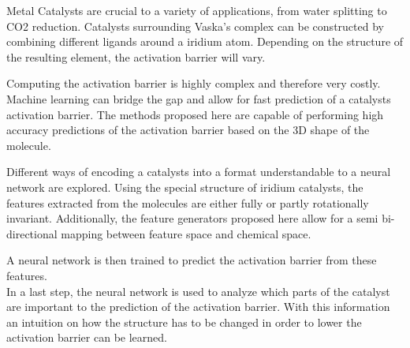 
\Abstract

Metal Catalysts are crucial to a variety of applications, from water splitting to CO2 reduction. %
Catalysts surrounding Vaska's complex can be constructed by combining different ligands around a iridium atom.
Depending on the structure of the resulting element, the activation barrier will vary.

Computing the activation barrier is highly complex and therefore very costly. 
Machine learning can bridge the gap and allow for fast prediction of a catalysts activation barrier.
The methods proposed here are capable of performing high accuracy predictions of the activation barrier based on
the 3D shape of the molecule.

Different ways of encoding a catalysts into a format understandable to a neural network are explored.
Using the special structure of iridium catalysts, the features extracted from the molecules are either fully or partly rotationally invariant.
Additionally, the feature generators proposed here allow for a semi bi-directional mapping between feature space and chemical space.

A neural network is then trained to predict the activation barrier from these features.
\\

In a last step, the neural network is used to analyze which parts of the catalyst are important to the prediction of the activation barrier.
With this information an intuition on how the structure has to be changed in order to lower the activation barrier can be learned.
